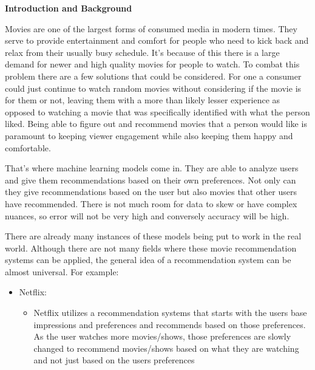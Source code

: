 \documentclass{article}
\begin{document}


\large

    \begin{flushleft}
        \textbf{\LARGE Introduction and Background}
    \end{flushleft}

\vspace{0.3cm}
\justifying
Movies are one of the largest forms of consumed media in modern times. They serve to provide entertainment and comfort for people who need to kick back and relax from their usually busy schedule. It’s because of this there is a large demand for newer and high quality movies for people to watch. To combat this problem there are a few solutions that could be considered. For one a consumer could just continue to watch random movies without considering if the movie is for them or not, leaving them with a more than likely lesser experience as opposed to watching a movie that was specifically identified with what the person liked. Being able to figure out and recommend movies that a person would like is paramount to keeping viewer engagement while also keeping them happy and comfortable.

\vspace{0.3cm}

That’s where machine learning models come in. They are able to analyze users and give them recommendations based on their own preferences. Not only can they give recommendations based on the user but also movies that other users have recommended. There is not much room for data to skew or have complex nuances, so error will not be very high and conversely accuracy will be high.

\vspace{0.3cm}

There are already many instances of these models being put to work in the real world. Although there are not many fields where these movie recommendation systems can be applied, the general idea of a recommendation system can be almost universal. For example:

\vspace{0.3cm}

    \begin{itemize}
        \item Netflix:
        \begin{itemize}
            \item Netflix utilizes a recommendation systems that starts with the users base impressions and preferences and recommends based on those preferences. As the user watches more movies/shows, those preferences are slowly changed to recommend movies/shows based on what they are watching and not just based on the users preferences
        \end{itemize}
    \end{itemize}
	
\end{document}

